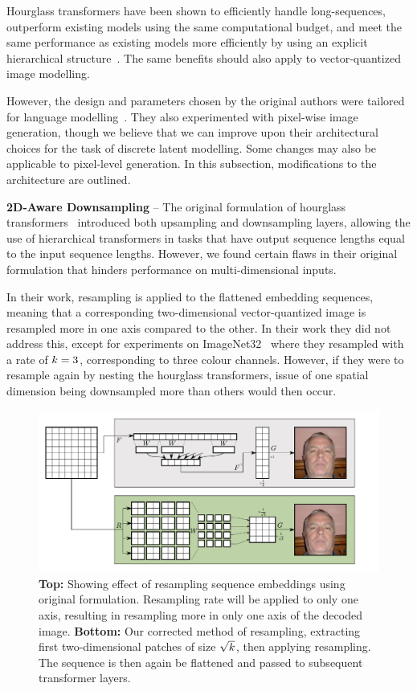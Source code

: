 Hourglass transformers have been shown to efficiently handle long-sequences,
outperform existing models using the same computational budget, and meet the
same performance as existing models more efficiently by using an explicit
hierarchical structure~\cite{nawrot2021hierarchical}. The same benefits should
also apply to vector-quantized image modelling. 

However, the design and parameters chosen by the original authors were tailored
for language modelling~\cite{nawrot2021hierarchical}. They also experimented
with pixel-wise image generation, though we believe that we can improve upon
their architectural choices for the task of discrete latent modelling. Some
changes may also be applicable to pixel-level generation. In this subsection,
modifications to the architecture are outlined.

\textbf{2D-Aware Downsampling} -- The original formulation of hourglass
transformers~\cite{nawrot2021hierarchical} introduced both upsampling and
downsampling layers, allowing the use of hierarchical transformers in tasks that
have output sequence lengths equal to the input sequence lengths. However,
we found certain flaws in their original formulation that hinders performance on
multi-dimensional inputs.

In their work, resampling is applied to the flattened embedding sequences,
meaning that a corresponding two-dimensional vector-quantized image is resampled
more in one axis compared to the other. In their work they did not address this,
except for experiments on ImageNet32~\cite{russakovsky2015imagenet} where they
resampled with a rate of $k=3$, corresponding to three colour
channels. However, if they were to resample again by nesting the hourglass
transformers, issue of one spatial dimension being
downsampled more than others would then occur.

\begin{figure}[ht!]
    \label{fig:resample}
    \centering
    \includegraphics[width=\textwidth]{figures/resample.pdf}
    \caption{
        \textbf{Top:} Showing effect of resampling sequence embeddings using
        original formulation. Resampling rate will be applied to only one axis,
        resulting in resampling more in only one axis of the decoded image.
        \textbf{Bottom:} Our corrected method of resampling, extracting first
        two-dimensional patches of size $\sqrt{k}$, then applying
        resampling. The sequence is then again be flattened and passed to
        subsequent transformer layers.
    }
\end{figure}

